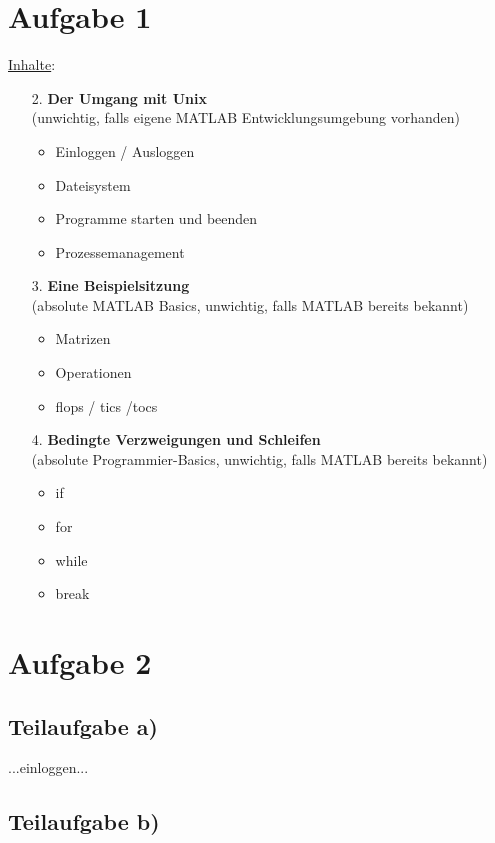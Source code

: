 \documentclass{llncs}
\begin{document}
\section*{Aufgabe 1}

\underline{Inhalte}:
\begin{itemize}
\item[2.] \textbf{Der Umgang mit Unix}\\(unwichtig, falls eigene MATLAB Entwicklungsumgebung vorhanden)
\begin{itemize}
\item Einloggen / Ausloggen
\item Dateisystem
\item Programme starten und beenden
\item Prozessemanagement
\end{itemize}
\item[3.] \textbf{Eine Beispielsitzung}\\(absolute MATLAB Basics, unwichtig, falls MATLAB bereits bekannt)
\begin{itemize}
\item Matrizen
\item Operationen
\item flops / tics /tocs
\end{itemize}
\item[4.] \textbf{Bedingte Verzweigungen und Schleifen}\\(absolute Programmier-Basics, unwichtig, falls MATLAB bereits bekannt)
\begin{itemize}
\item if
\item for
\item while
\item break
\end{itemize}
\end{itemize}
\newpage

\section*{Aufgabe 2}

\subsection*{Teilaufgabe a)}

...einloggen...

\subsection*{Teilaufgabe b)}
\end{document}
